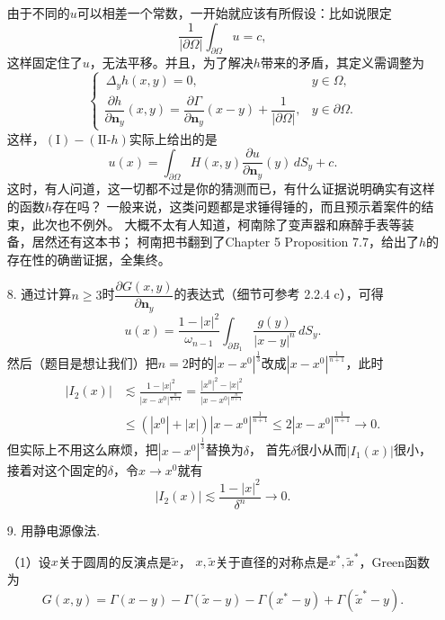 \begin{itemize}
    由于不同的$u$可以相差一个常数，一开始就应该有所假设：比如说限定
    \[\frac{1}{|\partial\varOmega|}\int_{\partial\varOmega}u=c,\]
    这样固定住了$u$，无法平移。并且，为了解决$h$带来的矛盾，其定义需调整为
    \begin{equation*}\tag{III'}\begin{cases}
        \,\Delta_y h(x,y)=0,&y\in\varOmega,\\
        \dfrac{\partial h}{\partial\boldsymbol{n}_y}(x,y)
        =\dfrac{\partial\varGamma}{\partial\boldsymbol{n}_y}(x-y)
        +\dfrac{1}{|\partial\varOmega|},&y\in\partial\varOmega.
    \end{cases}\end{equation*}
    这样，$(\text{I})-(\text{II-}h)$实际上给出的是
    \begin{equation*}\tag{IV'}
        u(x)=\int_{\partial\varOmega}H(x,y)\frac{\partial u}{\partial\boldsymbol{n}_y}(y)\,dS_y+c.
    \end{equation*}
    这时，有人问道，这一切都不过是你的猜测而已，有什么证据说明确实有这样的函数$h$存在吗？
    一般来说，这类问题都是求锤得锤的，而且预示着案件的结束，此次也不例外。
    大概不太有人知道，柯南除了变声器和麻醉手表等装备，居然还有\cite{Ta I}这本书；
    柯南把书翻到了Chapter 5 Proposition 7.7，给出了$h$的存在性的确凿证据，全集终。

    \item[8.] 通过计算$n\geqslant3$时$\dfrac{\partial G(x,y)}{\partial\boldsymbol{n}_y}$的表达式（细节可参考\cite{Ev} 2.2.4 c），可得
    \[u(x)=\frac{1-|x|^2}{\omega_{n-1}}\int_{\partial B_1}\frac{g(y)}{|x-y|^n}\,dS_y.\]
    然后（题目是想让我们）把$n=2$时的$|x-x^0|^\frac{1}{3}$改成$|x-x^0|^\frac{1}{n+1}$，此时
    \begin{align*}
        |I_2(x)|&\lesssim\frac{1-|x|^2}{|x-x^0|^\frac{n}{n+1}}
        =\frac{|x^0|^2-|x|^2}{|x-x^0|^\frac{n}{n+1}}\\
        &\leqslant(|x^0|+|x|)|x-x^0|^\frac{1}{n+1}
        \leqslant2|x-x^0|^\frac{1}{n+1}\to0.
    \end{align*}
    但实际上不用这么麻烦，把$|x-x^0|^\frac{1}{3}$替换为$\delta$，
    首先$\delta$很小从而$|I_1(x)|$很小，接着对这个固定的$\delta$，令$x \to x^0$就有
    \[|I_2(x)|\lesssim\frac{1-|x|^2}{\delta^n}\to0.\]
    
    \item[9.] 用静电源像法.
    
    （1）设$x$关于圆周的反演点是$\tilde{x}$，
    $x,\tilde{x}$关于直径的对称点是$x^*,\tilde{x}^*$，Green函数为
    $$G(x,y)=\varGamma(x-y)-\varGamma(\tilde{x}-y)-\varGamma(x^*-y)+\varGamma(\tilde{x}^*-y).$$


\end{itemize}
